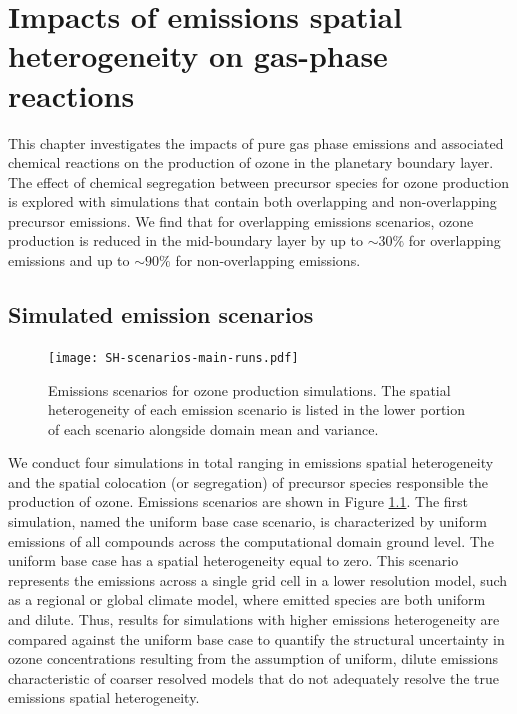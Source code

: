\chapter{Impacts of emissions spatial heterogeneity on gas-phase reactions}

This chapter investigates the impacts of pure gas phase emissions and associated chemical reactions on the production of ozone in the planetary boundary layer. The effect of chemical segregation between precursor species for ozone production is explored with simulations that contain both overlapping and non-overlapping precursor emissions. We find that for overlapping emissions scenarios, ozone production is reduced in the mid-boundary layer by up to $\sim30\%$ for overlapping emissions and up to $\sim90\%$ for non-overlapping emissions.

\section{Simulated emission scenarios}

\begin{figure}[h]
	\centering
	\texttt{[image: SH-scenarios-main-runs.pdf]}
	\caption{Emissions scenarios for ozone production simulations. The spatial heterogeneity of each emission scenario is listed in the lower portion of each scenario alongside domain mean and variance.}
	\label{fig:ozone-emission-patterns}
\end{figure}

We conduct four simulations in total ranging in emissions spatial heterogeneity and the spatial colocation (or segregation) of precursor species responsible the production of ozone. Emissions scenarios are shown in Figure \ref{fig:ozone-emission-patterns}. The first simulation, named the uniform base case scenario, is characterized by uniform emissions of all compounds across the computational domain ground level. The uniform base case has a spatial heterogeneity equal to zero. This scenario represents the emissions across a single grid cell in a lower resolution model, such as a regional or global climate model, where emitted species are both uniform and dilute. Thus, results for simulations with higher emissions heterogeneity are compared against the uniform base case to quantify the structural uncertainty in ozone concentrations resulting from the assumption of uniform, dilute emissions characteristic of coarser resolved models that do not adequately resolve the true emissions spatial heterogeneity.  

